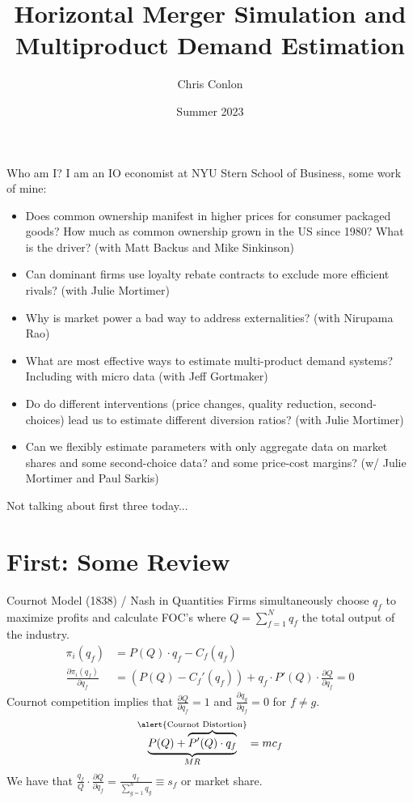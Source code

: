 \documentclass[aspectratio=169,10pt]{beamer}
\title{Horizontal Merger Simulation and Multiproduct Demand Estimation}
\author{Chris Conlon}
\institute{NYU Stern and NBER}
\date{Summer 2023}
\begin{document}
\begin{frame}[plain] %
\titlepage
\end{frame}


\begin{frame}{Who am I?}
I am an IO economist at NYU Stern School of Business, some work of mine:
\begin{itemize}
    \item Does \alert{common ownership} manifest in higher prices for consumer packaged goods? How much as common ownership grown in the US since 1980? What is the driver? (with Matt Backus and Mike Sinkinson)
    \item Can dominant firms use \alert{loyalty rebate contracts to exclude} more efficient rivals? (with Julie Mortimer)
    \item Why is market power a bad way to address \alert{externalities}? (with Nirupama Rao)
\item What are most effective ways to estimate multi-product demand systems? Including with micro data (with Jeff Gortmaker)
\item Do do \alert{different interventions} (price changes, quality reduction, second-choices) lead us to estimate different \alert{diversion ratios}? (with Julie Mortimer)
\item Can we flexibly estimate parameters with only aggregate data on market shares and some second-choice data? and some price-cost margins? (w/ Julie Mortimer and Paul Sarkis)
\end{itemize}
Not talking about first three today...
\end{frame}


\section{First: Some Review}


\begin{frame}{Cournot Model (1838) / Nash in Quantities}
Firms simultaneously choose $q_f$ to maximize profits and calculate FOC's where $Q=\sum_{f=1}^N q_f$ the total output of the industry.
\begin{align*}
\pi_i(q_f) &= P(Q)\cdot q_f - C_f(q_f)\\
\frac{\partial \pi_i(q_f)}{\partial q_f} &= (P(Q) - C_f'(q_f))  +  q_f  \cdot P'(Q) \cdot \frac{\partial Q}{\partial q_f}  = 0
\end{align*}
Cournot competition implies that $\frac{\partial Q}{\partial q_f} = 1$ and $\frac{\partial q_g}{\partial q_f} = 0$ for $f \neq g$.
\begin{align*}
\underbrace{P(Q) + \overbrace{P'(Q) \cdot q_f}}^{\text{\alert{Cournot Distortion}}}_{MR} =  mc_f
\end{align*}
We have that $\frac{q_f}{Q} \cdot \frac{\partial Q}{\partial q_f} = \frac{q_f}{\sum_{g=1}^n q_g} \equiv s_f$ or \alert{market share}.
\end{frame}
\end{document}
